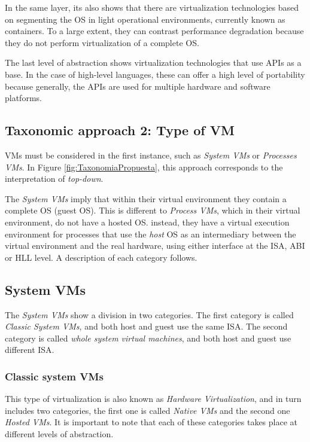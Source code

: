 	In the same layer, its also shows that there are virtualization technologies based on segmenting the OS in light operational environments, currently known as containers. To a large extent, they can contrast performance degradation because they do not perform virtualization of a complete OS.
	
	The last level of abstraction shows virtualization technologies that use APIs as a base. In the case of high-level languages, these can offer a high level of portability because generally, the APIs are used for multiple hardware and software platforms.
	
	\subsection{Taxonomic approach 2: Type of VM}
	
	VMs must be considered in the first instance, such as \textit{System VMs} or \textit{ Processes VMs}. In Figure \ref{fig:TaxonomiaPropuesta}, this approach corresponds to the interpretation of \textit{top-down}.
	
	The \textit{System VMs} imply that within their virtual environment they contain a complete OS (guest OS). This is different to \textit{Process VMs}, which in their virtual environment, do not have a hosted OS. instead, they have a virtual execution environment for processes that use the \textit{host} OS as an intermediary between the virtual environment and the real hardware, using either interface at the ISA, ABI or HLL level. A description of each category follows.
	
	\subsection{System VMs}
	
	The \textit{System VMs} show a division in two categories.  The first category is called \textit{Classic System VMs}, and both host and guest use the same ISA. The second category is called \textit{whole system virtual machines}, and both host and guest use different ISA.
	
	\subsubsection{Classic system VMs} This type of virtualization is also known as \textit{Hardware Virtualization}, and in turn includes two categories, the first one is called \textit{Native VMs} and the second one \textit{Hosted VMs}. It is important to note that each of these categories takes place at different levels of abstraction.
	

